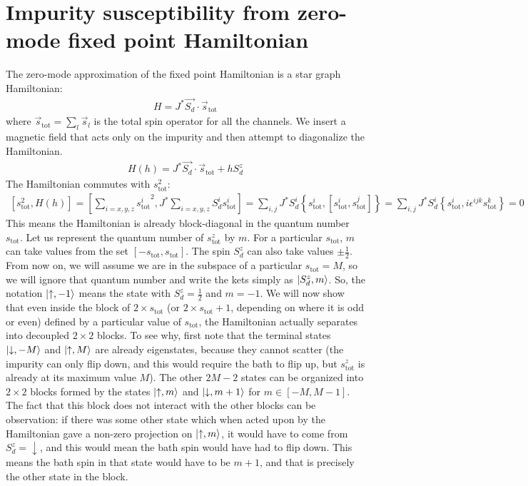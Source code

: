 \documentclass{revtex4-2}
\begin{document}
\section{Impurity susceptibility from zero-mode fixed point Hamiltonian}
The zero-mode approximation of the fixed point Hamiltonian is a star graph Hamiltonian:
\begin{align}
	H = J^* \vec{S_d}\cdot\vec{s}_\text{tot}
\end{align}
where \(\vec s_\text{tot} = \sum_l \vec s_l\) is the total spin operator for all the channels. We insert a magnetic field that acts only on the impurity and then attempt to diagonalize the Hamiltonian.
\begin{align}
	\label{stargraph_field_hamiltonian}
	H(h) = J^* \vec{S_d}\cdot\vec{s}_\text{tot} + h S_d^z
\end{align}
The Hamiltonian commutes with \(s_\text{tot}^2\):
\begin{align}
\left[s_\text{tot}^2, H(h)\right] = \left[\sum_{i=x,y,z}{s^i_\text{tot}}^2, J^* \sum_{i=x,y,z} S_d^i s^i_\text{tot}\right] = \sum_{i,j}J^* S_d^i \left\{s_\text{tot}^i, \left[s_\text{tot}^i,s_\text{tot}^j\right]\right\} = \sum_{i,j}J^* S_d^i \left\{s_\text{tot}^i, i \epsilon^{ijk}s^k_\text{tot}\right\} = 0
\end{align}
This means the Hamiltonian is already block-diagonal in the quantum number \(s_\text{tot}\). Let us represent the quantum number of \(s_\text{tot}^z\) by \(m\). For a particular \(s_\text{tot}\), \(m\) can take values from the set \(\left[-s_\text{tot}, s_\text{tot}\right] \). The spin \(S_d^z\) can also take values \(\pm \frac{1}{2}\). From now on, we will assume we are in the subspace of a particular \(s_\text{tot} = M\), so we will ignore that quantum number and write the kets simply as \(\ket{S_d^z, m}\). So, the notation \(\ket{\uparrow,-1}\) means the state with \(S_d^z = \frac{1}{2}\) and \(m = -1\). We will now show that even inside the block of \(2\times s_\text{tot}\) (or \(2\times s_\text{tot} + 1\), depending on where it is odd or even) defined by a particular value of \(s_\text{tot}\), the Hamiltonian actually separates into decoupled \(2\times 2\) blocks. To see why, first note that the terminal states \(\ket{\downarrow, -M}\) and \(\ket{\uparrow, M}\) are already eigenstates, because they cannot scatter (the impurity can only flip down, and this would require the bath to flip up, but \(s^z_\text{tot}\) is already at its maximum value \(M\)). The other \(2M - 2\) states can be organized into \(2\times 2\) blocks formed by the states \(\ket{\uparrow, m}\) and \(\ket{\downarrow, m+1}\) for \(m \in \left[-M, M-1\right] \). The fact that this block does not interact with the other blocks can be observation: if there was some other state which when acted upon by the Hamiltonian gave a non-zero projection on \(\ket{\uparrow, m}\), it would have to come from \(S_d^z = \downarrow\), and this would mean the bath spin would have had to flip down. This means the bath spin in that state would have to be \(m+1\), and that is precisely the other state in the block. 
\end{document}
